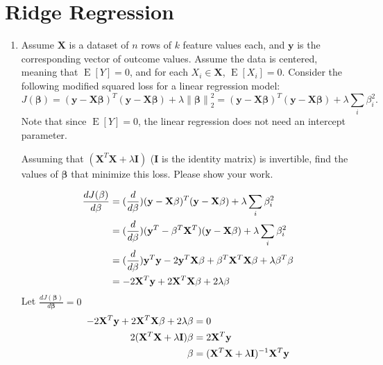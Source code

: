 \documentclass[11pt]{article}
\renewcommand{\vec}[1]{\mathbf{#1}}
\DeclareMathOperator{\E}{E}
\begin{document}
\pagebreak
\section{Ridge Regression}

\newcommand{\norm}[1]{\left\lVert#1\right\rVert}

\begin{enumerate}

\item Assume $\vec{X}$ is a dataset of $n$ rows of $k$ feature values each, and $\vec{y}$ is the corresponding vector of outcome values.
Assume the data is centered, meaning that $\E[Y] = 0$, and for each $X_i \in \vec{X}$, $\E[X_i] = 0$.
Consider the following modified squared loss for a linear regression model:
\begin{equation}
J(\vec{\beta}) = (\vec{y}-\vec{X}\vec{\beta})^T(\vec{y}-\vec{X}\vec{\beta}) + \lambda \norm{\vec{\beta}}_2^2 =
(\vec{y}-\vec{X}\vec{\beta})^T(\vec{y}-\vec{X}\vec{\beta}) + \lambda \sum_i \beta_i^2.
\end{equation}
Note that since $\E[Y] = 0$, the linear regression does not need an intercept parameter.

Assuming that $(\vec{X}^T\vec{X}+\lambda \vec{I})$ ($\vec{I}$ is the identity matrix) is invertible, find the values of $\vec{\beta}$ that minimize this loss.  Please show your work.

\begin{answertext}{10cm}{}

\begin{align}
\frac{dJ(\vec{\beta})}{d\vec{\beta}} &= (\frac{d}{d\vec{\beta}}) (\vec{y} - \vec{X}\vec{\beta})^{T} (\vec{y} - \vec{X}\vec{\beta}) + \lambda \sum_{i}{\beta_{i}^{2}} \notag\\
&= (\frac{d}{d\vec{\beta}}) (\vec{y}^{T} - \vec{\beta}^{T}\vec{X}^{T}) (\vec{y} - \vec{X}\vec{\beta}) + \lambda \sum_{i}{\beta_{i}^{2}} \notag\\
&= (\frac{d}{d\vec{\beta}}) \vec{y}^{T}\vec{y} - 2\vec{y}^{T}\vec{X}\vec{\beta} + \vec{\beta}^{T}\vec{X}^{T}\vec{X}\vec{\beta} + \lambda\vec{\beta}^{T}\vec{\beta} \notag\\
&= -2\vec{X}^{T}\vec{y} + 2\vec{X}^{T}\vec{X}\vec{\beta} + 2\lambda\vec{\beta} \notag
\end{align}
Let $\frac{dJ(\vec{\beta})}{d\vec{\beta}} = 0$ 
\begin{align}
-2\vec{X}^{T}\vec{y} + 2\vec{X}^{T}\vec{X}\vec{\beta} + 2\lambda\vec{\beta} &= 0 \notag\\
2(\vec{X}^{T}\vec{X} + \lambda\vec{I})\vec{\beta} &= 2\vec{X}^{T}\vec{y} \notag\\
\vec{\beta} &= (\vec{X}^{T}\vec{X} + \lambda\vec{I})^{-1} \vec{X}^{T}\vec{y} \notag
\end{align}


\end{answertext}
\end{enumerate}
\end{document}
